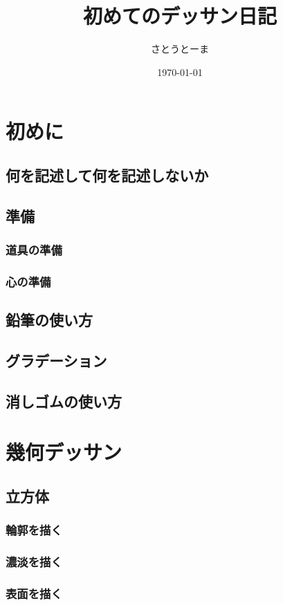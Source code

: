 \documentclass[a4paper,11pt]{jsbook}
\begin{document}
\title{初めてのデッサン日記}
\author{さとうとーま}
\date{\today}
\maketitle
\tableofcontents

\part{初めに}
\chapter{何を記述して何を記述しないか}
\chapter{準備}
\section{道具の準備}
\section{心の準備}
\chapter{鉛筆の使い方}
\chapter{グラデーション}
\chapter{消しゴムの使い方}

\part{幾何デッサン}
\chapter{立方体}
\section{輪郭を描く}
\section{濃淡を描く}
\section{表面を描く}
\end{document}
